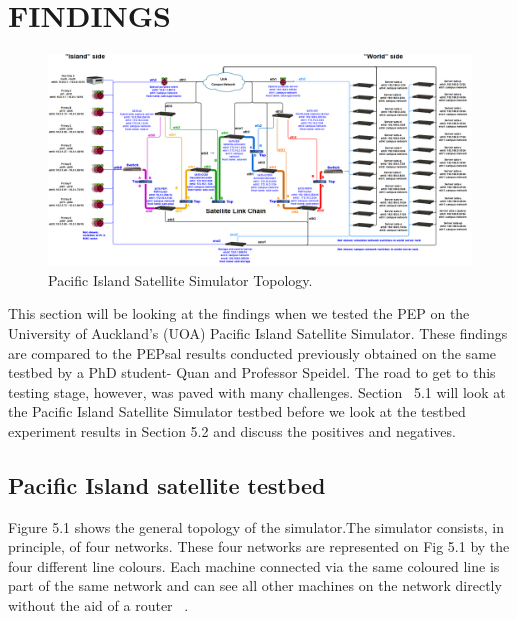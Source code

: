 \chapter{FINDINGS}
\begin{figure}[ht!]
    \centering
    \includegraphics[width=1.3\textwidth, angle =270]{Simulator.png}
    \caption{Pacific Island Satellite Simulator Topology. }
    \label{fig: Satellite Simulator} 
\end{figure}

This section will be looking at the findings when we tested the PEP on the University of Auckland's (UOA) Pacific Island Satellite Simulator. These findings are compared to the PEPsal results conducted previously obtained on the same testbed by a PhD student- Quan and Professor Speidel. The road to get to this testing stage, however, was paved with many challenges. Section ~5.1 will look at the Pacific Island Satellite Simulator testbed before we look at the testbed experiment results in Section 5.2 and discuss the positives and negatives.  \\

\section{Pacific Island satellite testbed}
Figure 5.1 shows the general topology of the simulator.The simulator consists, in principle, of four networks. These four networks are represented on Fig 5.1 by the four different line colours. Each machine connected via the same coloured line is part of the same network and can see all other machines on the network directly without the aid of a router ~\cite{21}. \\

